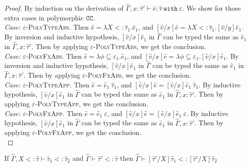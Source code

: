 \documentclass{llncs}
\newcommand{\keywadj}[1]{\mathtt{#1}}
\newcommand{\keyw}[1]{\keywadj{#1}~}
\newcommand{\kw}[1]{\keyw{ #1 }}
\newcommand{\kwa}[1]{\keywadj{ #1 }}
\begin{document}
\begin{proof} By induction on the derivation of $\hat \Gamma, x: \hat \tau' \vdash \hat e: \hat \tau~\kw{with} \varepsilon$. We show for those extra cases in polymorphic $\kwa{CC}$.\\



\textit{Case:} \textsc{$\varepsilon$-PolyTypeAbs}. Then $\hat e = \lambda X <: \hat \tau_1. \hat e_1$, and $[\hat v/x]\hat e = \lambda X <: \hat \tau_1. [\hat v/y]\hat e_1$. By inversion and inductive hypothesis, $[\hat v/x]\hat e_1$ in $\hat \Gamma$ can be typed the same as $\hat e_1$ in $\hat \Gamma, x: \hat \tau'$. Then by applying \textsc{$\varepsilon$-PolyTypeAbs}, we get the conclusion.\\

\textit{Case:} \textsc{$\varepsilon$-PolyFxAbs}. Then $\hat e = \lambda \phi \subseteq \varepsilon_1. \hat e_1$, and $[\hat v/x]\hat e = \lambda \phi \subseteq \varepsilon_1. [\hat v/x]\hat e_1$. By inversion and inductive hypothesis, $[\hat v/x]\hat e_1$ in $\hat \Gamma$ can be typed the same as $\hat e_1$ in $\hat \Gamma, x: \hat \tau'$. Then by applying \textsc{$\varepsilon$-PolyFxAbs}, we get the conclusion. \\


\textit{Case:} \textsc{$\varepsilon$-PolyTypeApp}. Then $\hat e = \hat e_1~\hat \tau_1$, and $[\hat v/x]\hat e = [\hat v/x]\hat e_1~\hat \tau_1$. By inductive hypothesis, $[\hat v/x]\hat e_1$ in $\hat \Gamma$ can be typed the same as $\hat e_1$ in $\hat \Gamma, x: \hat \tau'$. Then by applying \textsc{$\varepsilon$-PolyTypeApp}, we get the conclusion.\\

\textit{Case:} \textsc{$\varepsilon$-PolyFxApp}. Then $\hat e = \hat e_1~\varepsilon$, and $[\hat v/x]\hat e = [\hat v/x]\hat e_1~\varepsilon$. By inductive hypothesis, $[\hat v/x]\hat e_1$ in $\hat \Gamma$ can be typed the same as $\hat e_1$ in $\hat \Gamma, x: \hat \tau'$. Then by applying \textsc{$\varepsilon$-PolyFxApp}, we get the conclusion.\\



\end{proof}


\hrulefill

\begin{lemma}
If $\hat \Gamma, X <: \hat \tau \vdash \hat \tau_1 <: \hat \tau_2$ and $\hat \Gamma \vdash \hat \tau' <: \hat \tau$ then $\hat \Gamma \vdash [\hat \tau'/X]\hat \tau_1 <: [\hat \tau'/X]\hat \tau_2$
\end{lemma}
\end{document}

